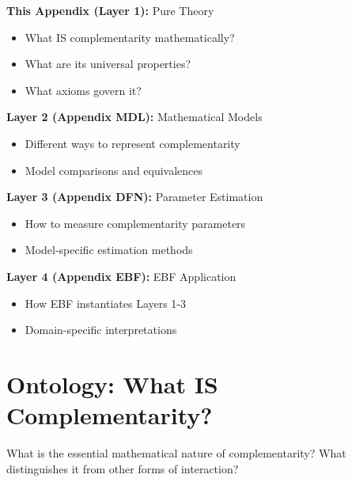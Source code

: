 \begin{tcolorbox}[colback=gray!5!white,colframe=gray!75!black,title=\textbf{Architectural Position}]
\small
\textbf{This Appendix (Layer 1):} Pure Theory
\begin{itemize}[noitemsep]
    \item What IS complementarity mathematically?
    \item What are its universal properties?
    \item What axioms govern it?
\end{itemize}

\textbf{Layer 2 (Appendix MDL):} Mathematical Models
\begin{itemize}[noitemsep]
    \item Different ways to represent complementarity
    \item Model comparisons and equivalences
\end{itemize}

\textbf{Layer 3 (Appendix DFN):} Parameter Estimation
\begin{itemize}[noitemsep]
    \item How to measure complementarity parameters
    \item Model-specific estimation methods
\end{itemize}

\textbf{Layer 4 (Appendix EBF):} EBF Application
\begin{itemize}[noitemsep]
    \item How EBF instantiates Layers 1-3
    \item Domain-specific interpretations
\end{itemize}
\end{tcolorbox}

\section{Ontology: What IS Complementarity?}
\label{sec:ontology}

\begin{tcolorbox}[colback=red!5!white,colframe=red!75!black,title=\textbf{Fundamental Question}]
What is the essential mathematical nature of complementarity? What distinguishes it from other forms of interaction?
\end{tcolorbox}

